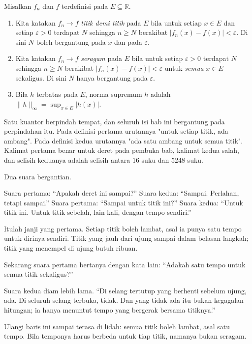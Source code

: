 \begin{definisi}
Misalkan $f_n$ dan $f$ terdefinisi pada $E\subseteq\mathbb{R}$.
\begin{enumerate}
\item Kita katakan $f_n\to f$ \emph{titik demi titik} pada $E$ bila untuk setiap $x\in E$ dan setiap
      $\varepsilon>0$ terdapat $N$ sehingga $n\ge N$ berakibat
      $|f_n(x)-f(x)|<\varepsilon$. Di sini $N$ boleh bergantung pada $x$ dan
      pada $\varepsilon$.
\item Kita katakan $f_n\to f$ \emph{seragam} pada
      $E$ bila untuk setiap $\varepsilon>0$ terdapat $N$ sehingga $n\ge N$
      berakibat $|f_n(x)-f(x)|<\varepsilon$ untuk \emph{semua} $x\in E$
      sekaligus. Di sini $N$ hanya bergantung pada $\varepsilon$.
\item Bila $h$ terbatas pada $E$, norma supremum $h$
      adalah $\|h\|_\infty=\sup_{x\in E}|h(x)|$.
\end{enumerate}
\end{definisi}


Satu kuantor berpindah tempat, dan seluruh isi bab ini bergantung pada
perpindahan itu. Pada definisi pertama urutannya "untuk setiap titik, ada
ambang". Pada definisi kedua urutannya "ada satu ambang untuk semua titik".
Kalimat pertama benar untuk deret pada pembuka bab, kalimat kedua salah, dan
selisih keduanya adalah selisih antara $16$ suku dan $5248$ suku.

\begin{bacakeras}
Dua suara bergantian.

Suara pertama: ``Apakah deret ini sampai?''
Suara kedua: ``Sampai. Perlahan, tetapi sampai.''
Suara pertama: ``Sampai untuk titik ini?''
Suara kedua: ``Untuk titik ini. Untuk titik sebelah, lain kali, dengan tempo sendiri.''

Itulah janji yang pertama. Setiap titik boleh lambat, asal ia punya satu tempo
untuk dirinya sendiri. Titik yang jauh dari ujung sampai dalam belasan langkah;
titik yang menempel di ujung butuh ribuan.

Sekarang suara pertama bertanya dengan kata lain: ``Adakah satu tempo untuk
semua titik sekaligus?''

Suara kedua diam lebih lama. ``Di selang tertutup yang berhenti sebelum ujung,
ada. Di seluruh selang terbuka, tidak. Dan yang tidak ada itu bukan kegagalan
hitungan; ia hanya menuntut tempo yang bergerak bersama titiknya.''

Ulangi baris ini sampai terasa di lidah: semua titik boleh lambat, asal satu
tempo. Bila temponya harus berbeda untuk tiap titik, namanya bukan seragam.
\end{bacakeras}

